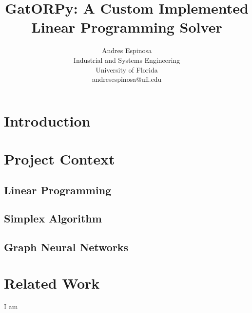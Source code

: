 \documentclass[conference]{IEEEtran}
\begin{document}
\title{GatORPy: A Custom Implemented Linear Programming Solver}

\author{
    \begin{minipage}{0.50\textwidth}
        \centering
        \textcolor{uf_blue}{Andres Espinosa} \\
        \textcolor{uf_orange}{Industrial and Systems Engineering} \\
        \textcolor{uf_orange}{University of Florida} \\
        \textcolor{uf_orange}{andresespinosa@ufl.edu} \\ 
    \end{minipage}
}


\maketitle


\begin{abstract}

\end{abstract}

\IEEEpeerreviewmaketitle

\section{Introduction}

\section{Project Context}

\subsection{Linear Programming}
\subsection{Simplex Algorithm}
\subsection{Graph Neural Networks}

\section{Related Work}
I am \cite{gnndrl:Devailly_2022}
\end{document}
